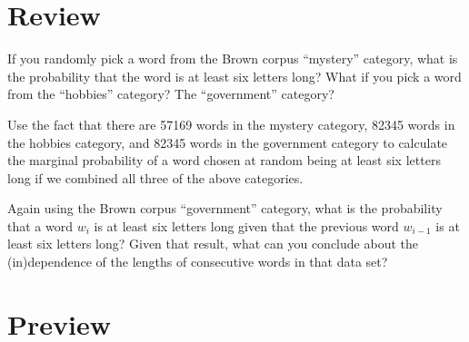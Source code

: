\documentclass[11pt,letterpaper,boxed]{hmcpset}
\begin{document}
\section*{Review} 
\begin{problem}
If you randomly pick a word from the Brown corpus ``mystery''
category, what is the probability that the word is at least six
letters long? What if you pick a word from the ``hobbies'' category? The ``government'' category?

Use the fact that there are 57169 words in the mystery category, 82345
words in the hobbies category, and 82345 words in the government
category to calculate the marginal probability of a word chosen at
random being at least six letters long if we combined all three of the
above categories. 
\end{problem}

\begin{solution}
\vspace{6cm}
\end{solution}
 
\begin{problem}
Again  using the Brown corpus ``government'' category, what is the
probability that a word $w_i$ is at least six letters long given that
the previous word $w_{i-1}$ is at least six letters long? Given that
result, what can you conclude about the (in)dependence of the lengths
of consecutive words in that data set?
\end{problem}
\begin{solution}
\vspace{6cm}
\end{solution}

\pagebreak

\section*{Preview} 
\end{document}
